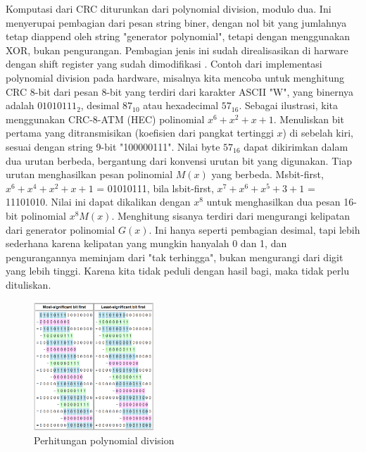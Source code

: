 Komputasi dari CRC diturunkan dari polynomial division, modulo dua. Ini menyerupai pembagian dari pesan string biner, dengan nol bit yang jumlahnya tetap diappend oleh string "generator polynomial", tetapi dengan menggunakan XOR, bukan pengurangan. Pembagian jenis ini sudah direalisasikan di harware dengan shift register yang sudah dimodifikasi \citep{dubrova2012}. Contoh dari implementasi polynomial division pada hardware, misalnya kita mencoba untuk menghitung CRC 8-bit dari pesan 8-bit yang terdiri dari karakter ASCII "W", yang binernya adalah \(01010111_2\), desimal \(87_10\) atau hexadecimal \(57_16\). Sebagai ilustrasi, kita menggunakan CRC-8-ATM (HEC) polinomial \(x^6+x^2+x+1\). Menuliskan bit pertama yang ditransmisikan (koefisien dari pangkat tertinggi \(x\)) di sebelah kiri, sesuai dengan string 9-bit "100000111". Nilai byte \(57_16\) dapat dikirimkan dalam dua urutan berbeda, bergantung dari konvensi urutan bit yang digunakan. Tiap urutan menghasilkan pesan polinomial \(M(x)\) yang berbeda. Msbit-first, \(x^6+x^4+x^2+x+1\) = 01010111, bila lsbit-first, \(x^7+x^6+x^5+3+1\) = 11101010. Nilai ini dapat dikalikan dengan \(x^8\) untuk menghasilkan dua pesan 16-bit polinomial \(x^8M(x)\). Menghitung sisanya terdiri dari mengurangi kelipatan dari generator polinomial \(G(x)\). Ini hanya seperti pembagian desimal, tapi lebih sederhana karena kelipatan yang mungkin hanyalah 0 dan 1, dan pengurangannya meminjam dari "tak terhingga", bukan mengurangi dari digit yang lebih tinggi. Karena kita tidak peduli dengan hasil bagi, maka tidak perlu dituliskan.

\begin{figure} [ht]
  \centering
  \includegraphics[width=0.4\textwidth]{gambar/komputasicrc.png}

  \caption{Perhitungan polynomial division}
  \label{fig:crccomputation}
\end{figure}

